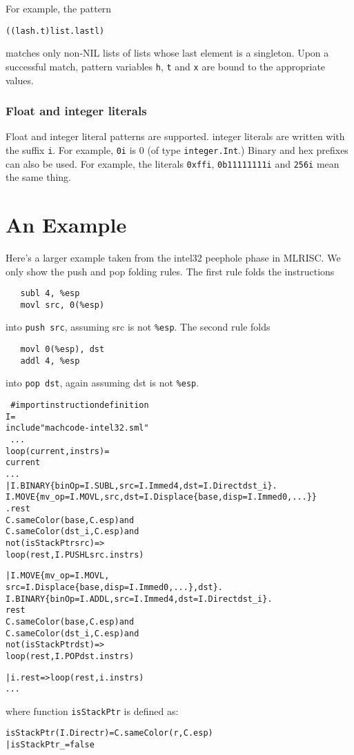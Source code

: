 For example, the pattern
\begin{alltt}
  ((l as h . t) \WHERE list.last l \IN [x])
\end{alltt}   
matches only non-NIL lists of lists whose last element is a singleton.
Upon a successful match, pattern variables \verb|h|, 
\verb|t| and \verb|x| are bound to the appropriate values.

\subsubsection{Float and integer literals}
 Float and integer literal patterns are supported.
integer literals are written with the suffix \verb|i|.
For example, \verb|0i| is 0 (of type \verb|integer.Int|.)
Binary and hex prefixes can also be used.
For example, the literals \verb|0xffi|, \verb|0b11111111i|
and \verb|256i| mean the same thing.

\section{An Example}
Here's a larger example taken from the intel32 peephole phase in MLRISC.
We only show the push and pop folding rules.  The first rule
folds the instructions 
\begin{verbatim}
   subl 4, %esp
   movl src, 0(%esp)
\end{verbatim}
into \verb|push src|, assuming src is not \verb|%esp|. 
The second rule folds
\begin{verbatim}
   movl 0(%esp), dst
   addl 4, %esp
\end{verbatim}
into \verb|pop dst|, again assuming dst is not \verb|%esp|.

\begin{alltt}
\LOCAL\ 
   #  import instruction definition 
   \PACKAGE I = 
   \STRUCT
      include "machcode-intel32.sml" 
   \END
\IN\ 
   {\sl ... }
   \FUN loop(current, instrs) =
       \CASE current \OF
         {\sl ... }
      | I.BINARY\{binOp=I.SUBL, src=I.Immed 4, dst=I.Direct dst_i\} . 
        I.MOVE\{mv_op=I.MOVL,src,dst=I.Displace\{base,disp=I.Immed 0, ...\}\}
        . rest 
           \WHERE C.sameColor(base, C.esp) and
                  C.sameColor(dst_i, C.esp) and
                  not(isStackPtr src) =>
           loop(rest, I.PUSHL src . instrs)
               
      | I.MOVE\{mv_op=I.MOVL, 
              src=I.Displace\{base, disp=I.Immed 0, ...\}, dst\} .
        I.BINARY\{binOp=I.ADDL, src=I.Immed 4, dst=I.Direct dst_i\} . 
        rest 
           \WHERE C.sameColor(base, C.esp) and
                 C.sameColor(dst_i,C.esp) and
                 not(isStackPtr dst) =>
           loop(rest, I.POP dst . instrs)

     | i . rest => loop(rest, i . instrs)
     {\sl ... }
\END
\end{alltt}
where function \verb|isStackPtr| is defined as:
\begin{alltt}
  \FUN isStackPtr(I.Direct r) = C.sameColor(r,C.esp)
     | isStackPtr _ = false
\end{alltt}

